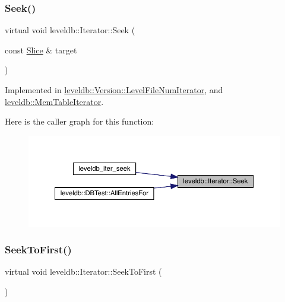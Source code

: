 \subsubsection{\texorpdfstring{Seek()}{Seek()}}
{\footnotesize\ttfamily virtual void leveldb\+::\+Iterator\+::\+Seek (\begin{DoxyParamCaption}\item[{const \mbox{\hyperlink{classleveldb_1_1_slice}{Slice}} \&}]{target }\end{DoxyParamCaption})\hspace{0.3cm}{\ttfamily [pure virtual]}}



Implemented in \mbox{\hyperlink{classleveldb_1_1_version_1_1_level_file_num_iterator_adbe855f4a783c2f578e1ff2fbb5259b2}{leveldb\+::\+Version\+::\+Level\+File\+Num\+Iterator}}, and \mbox{\hyperlink{classleveldb_1_1_mem_table_iterator_a140f9575286994337de9b49ea7fe62cb}{leveldb\+::\+Mem\+Table\+Iterator}}.

Here is the caller graph for this function\+:
\nopagebreak
\begin{figure}[H]
\begin{center}
\leavevmode
\includegraphics[width=350pt]{classleveldb_1_1_iterator_a97a556e97ded60c677fbf4de7321ec44_icgraph}
\end{center}
\end{figure}
\mbox{\label{classleveldb_1_1_iterator_a3594967cf26ddf1d37c7b886bb48627e}} 
\subsubsection{\texorpdfstring{SeekToFirst()}{SeekToFirst()}}
{\footnotesize\ttfamily virtual void leveldb\+::\+Iterator\+::\+Seek\+To\+First (\begin{DoxyParamCaption}{ }\end{DoxyParamCaption})\hspace{0.3cm}{\ttfamily [pure virtual]}}



